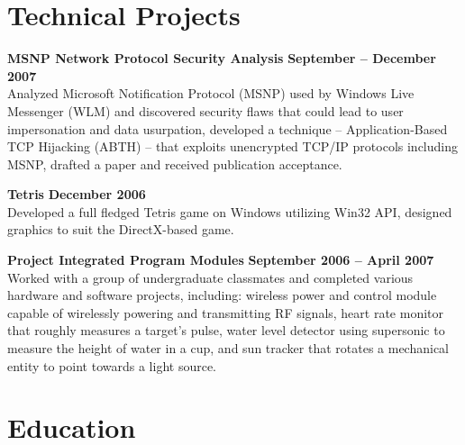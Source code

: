 \documentclass[margin,line]{resume}
\begin{document}
\begin{resume}
    \section{\mysidestyle Technical Projects}
    \textbf{MSNP Network Protocol Security Analysis} \hfill \textbf{September -- December 2007} \vspace{2mm}\\\vspace{1mm}%
    Analyzed Microsoft Notification Protocol (MSNP) used by Windows Live Messenger (WLM) and discovered security flaws that could lead to user impersonation and data usurpation,
    developed a technique -- Application-Based TCP Hijacking (ABTH) -- that exploits unencrypted TCP/IP protocols including MSNP,
    drafted a paper and received publication acceptance.

    \textbf{Tetris} \hfill \textbf{December 2006} \vspace{2mm}\\\vspace{1mm}%
    Developed a full fledged Tetris game on Windows utilizing Win32 API,
    designed graphics to suit the DirectX-based game.

    \textbf{Project Integrated Program Modules} \hfill \textbf{September 2006 -- April 2007} \vspace{2mm}\\\vspace{1mm}%
    Worked with a group of undergraduate classmates and completed various hardware and software projects, including:
    wireless power and control module capable of wirelessly powering and transmitting RF signals,
    heart rate monitor that roughly measures a target's pulse,
    water level detector using supersonic to measure the height of water in a cup, and
    sun tracker that rotates a mechanical entity to point towards a light source.

    \section{\mysidestyle Education}


\end{resume}
\end{document}
